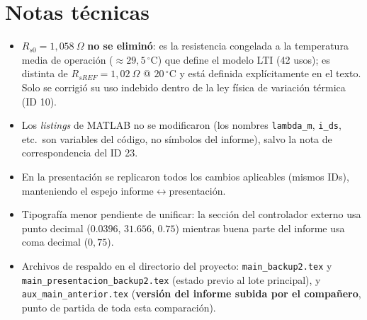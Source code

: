 \documentclass[11pt,a4paper]{article}
\begin{document}
\section{Notas técnicas}
\begin{itemize}
  \item $R_{s0}=1{,}058\ \Omega$ \textbf{no se eliminó}: es la resistencia congelada a la temperatura media de operación ($\approx 29{,}5\,^\circ$C) que define el modelo LTI (42 usos); es distinta de $R_{sREF}=1{,}02\ \Omega$ @ $20\,^\circ$C y está definida explícitamente en el texto. Solo se corrigió su uso indebido dentro de la ley física de variación térmica (ID 10).
  \item Los \emph{listings} de MATLAB no se modificaron (los nombres \texttt{lambda\_m}, \texttt{i\_ds}, etc.\ son variables del código, no símbolos del informe), salvo la nota de correspondencia del ID 23.
  \item En la presentación se replicaron todos los cambios aplicables (mismos IDs), manteniendo el espejo informe$\leftrightarrow$presentación.
  \item Tipografía menor pendiente de unificar: la sección del controlador externo usa punto decimal ($0.0396$, $31.656$, $0.75$) mientras buena parte del informe usa coma decimal ($0{,}75$).
  \item Archivos de respaldo en el directorio del proyecto: \texttt{main\_backup2.tex} y \texttt{main\_presentacion\_backup2.tex} (estado previo al lote principal), y \texttt{aux\_main\_anterior.tex} (\textbf{versión del informe subida por el compañero}, punto de partida de toda esta comparación).
\end{itemize}
\end{document}
